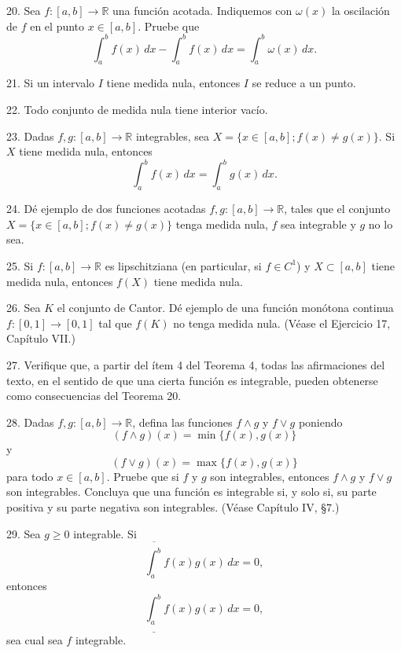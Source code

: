 \documentclass[12pt,oneside]{book}
\begin{document}
20. Sea \(f: [a, b] \to \mathbb{R}\) una función acotada. Indiquemos con \(\omega(x)\) la oscilación de \(f\) en el punto \(x \in [a, b]\). Pruebe que
\[
\int_a^b f(x) \, dx - \int_a^b f(x) \, dx = \int_a^b \omega(x) \, dx.
\]

21. Si un intervalo \(I\) tiene medida nula, entonces \(I\) se reduce a un punto.

22. Todo conjunto de medida nula tiene interior vacío.

23. Dadas \(f, g: [a, b] \to \mathbb{R}\) integrables, sea \(X = \{x \in [a, b]; f(x) \neq g(x)\}\). Si \(X\) tiene medida nula, entonces
\[
\int_a^b f(x) \, dx = \int_a^b g(x) \, dx.
\]

24. Dé ejemplo de dos funciones acotadas \(f, g: [a, b] \to \mathbb{R}\), tales que el conjunto \(X = \{x \in [a, b]; f(x) \neq g(x)\}\) tenga medida nula, \(f\) sea integrable y \(g\) no lo sea.

25. Si \(f: [a, b] \to \mathbb{R}\) es lipschitziana (en particular, si \(f \in C^1\)) y \(X \subset [a, b]\) tiene medida nula, entonces \(f(X)\) tiene medida nula.

26. Sea \(K\) el conjunto de Cantor. Dé ejemplo de una función monótona continua \(f: [0, 1] \to [0, 1]\) tal que \(f(K)\) no tenga medida nula. (Véase el Ejercicio 17, Capítulo VII.)

27. Verifique que, a partir del ítem 4 del Teorema 4, todas las afirmaciones del texto, en el sentido de que una cierta función es integrable, pueden obtenerse como consecuencias del Teorema 20.

28. Dadas \(f, g: [a, b] \to \mathbb{R}\), defina las funciones \(f \wedge g\) y \(f \vee g\) poniendo
\[
(f \wedge g)(x) = \min\{f(x), g(x)\}
\]
y
\[
(f \vee g)(x) = \max\{f(x), g(x)\}
\]
para todo \(x \in [a, b]\). Pruebe que si \(f\) y \(g\) son integrables, entonces \(f \wedge g\) y \(f \vee g\) son integrables. Concluya que una función es integrable si, y solo si, su parte positiva y su parte negativa son integrables. (Véase Capítulo IV, §7.)

29. Sea \(g \geq 0\) integrable. Si
\[
\overline{\int_a^b} f(x) g(x) \, dx = 0,
\]
entonces
\[
\underline{\int_a^b} f(x) g(x) \, dx = 0,
\]
sea cual sea \(f\) integrable.
\end{document}
